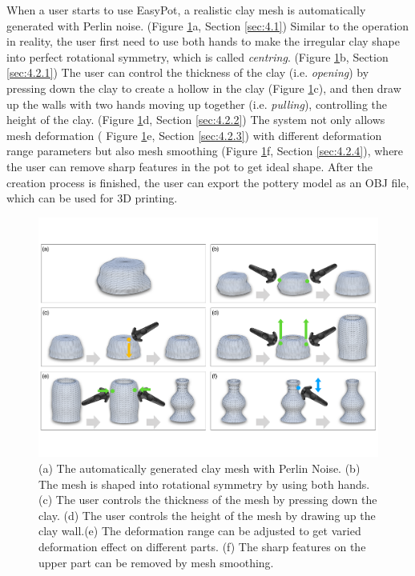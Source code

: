\documentclass{svjour3}                     %
\begin{document}
When a user starts to use EasyPot, a realistic clay mesh is automatically generated with Perlin noise. (Figure \ref{fig:workflow}a, Section \ref{sec:4.1})
Similar to the operation in reality, the user first need to use both hands to make the irregular clay shape into perfect rotational symmetry, which is called \textit{centring}. (Figure \ref{fig:workflow}b, Section \ref{sec:4.2.1})
The user can control the thickness of the clay (i.e. \textit{opening}) by pressing down the clay to create a hollow in the clay (Figure \ref{fig:workflow}c), 
and then draw up the walls with two hands moving up together (i.e. \textit{pulling}), controlling the height of the clay. (Figure \ref{fig:workflow}d, Section \ref{sec:4.2.2})
The system not only allows mesh deformation ( Figure \ref{fig:workflow}e, Section \ref{sec:4.2.3}) with different deformation range parameters but also mesh smoothing (Figure \ref{fig:workflow}f, Section \ref{sec:4.2.4}), where the user can remove sharp features in the pot to get ideal shape.
After the creation process is finished, the user can export the pottery model as an OBJ file, which can be used for 3D printing.

\begin{figure}
\includegraphics[width=\textwidth]{workflow.pdf}
\caption{(a) The automatically generated clay mesh with Perlin Noise. (b) The mesh is shaped into rotational symmetry by using both hands. (c) The user controls the thickness of the mesh by pressing down the clay. (d) The user controls the height of the mesh by drawing up the clay wall.(e) The deformation range can be adjusted to get varied deformation effect on different parts. (f) The sharp features on the upper part can be removed by mesh smoothing.}
\label{fig:workflow}
\end{figure}
\end{document}

